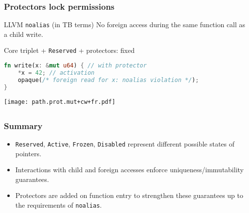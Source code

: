 \begin{frame}[fragile]
    \frametitle{Protectors lock permissions}
    \begin{alertblock}{LLVM \texttt{noalias} (in TB terms)}
        No foreign access during the same function call as a child write.
    \end{alertblock}

    \begin{block}{Core triplet + \texttt{Reserved} + protectors: fixed}
        \begin{lstlisting}[language=rust, escapechar=@]
fn write(x: &mut u64) { // with protector
    *x = 42; // activation
    opaque(/* foreign read for x: noalias violation */);
}
        \end{lstlisting}
    \end{block}
    \texttt{[image: path.prot.mut+cw+fr.pdf]}
\end{frame}

\subsection*{}

\begin{frame}
    \frametitle{Summary}
    \begin{itemize}
        \item \texttt{Reserved}, \texttt{Active}, \texttt{Frozen}, \texttt{Disabled}
            represent different possible states of pointers.\\
        \item Interactions with child and foreign accesses enforce uniqueness/immutability guarantees.
        \item Protectors are added on function entry to strengthen these guarantees up to the
            requirements of \texttt{noalias}.\\
    \end{itemize}
\end{frame}
